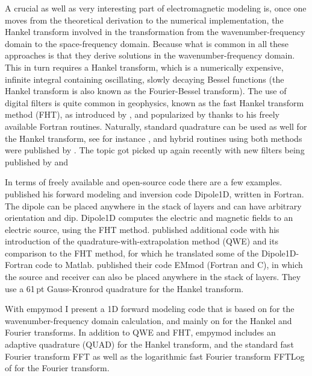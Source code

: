 \documentclass[paper]{geophysics}
\begin{document}
A crucial as well as very interesting part of electromagnetic modeling is, once
one moves from the theoretical derivation to the numerical implementation, the
Hankel transform involved in the transformation from the
wave\-num\-ber-fre\-que\-ncy domain to the space-frequency domain. Because
what is common in all these approaches is that they derive solutions in the
wavenumber-frequency domain. This in turn requires a Hankel transform, which is
a numerically expensive, infinite integral containing oscillating, slowly
decaying Bessel functions (the Hankel transform is also known as the
Fourier-Bessel transform). The use of digital filters is quite common in
geophysics, known as the fast Hankel transform method (FHT), as introduced by
\cite{GP.71.Gosh}, and popularized by \cite{TRP.75.Anderson, GEO.79.Anderson,
TMS.82.Anderson} thanks to his freely available Fortran routines. Naturally,
standard quadrature can be used as well for the Hankel transform, see for
instance \cite{GEO.83.Chave}, and hybrid routines using both methods were
published by \cite{GEO.84.Anderson, GEO.89.Anderson}. The topic got picked up
again recently with new filters being published by \cite{GP.07.Kong} and
\cite{GEO.09.Key, GEO.12.Key}

In terms of freely available and open-source code there are a few examples.
\cite{GEO.09.Key} published his forward modeling and inversion code Dipole1D,
written in Fortran. The dipole can be placed anywhere in the stack of layers
and can have arbitrary orientation and dip. Dipole1D computes the electric and
magnetic fields to an electric source, using the FHT method. \cite{GEO.12.Key}
published additional code with his introduction of the
qua\-dra\-ture-with-ex\-tra\-po\-la\-tion method (QWE) and its comparison to
the FHT method, for which he translated some of the Dipole1D-Fortran code to
Matlab. \cite{GEO.15.Hunziker} published their code EMmod (Fortran and C), in
which the source and receiver can also be placed anywhere in the stack of
layers. They use a 61\,pt Gauss-Kronrod quadrature for the Hankel transform.

With empymod I present a 1D forward modeling code that is based on
\cite{GEO.15.Hunziker} for the wavenumber-frequency domain calculation, and
mainly on \cite{GEO.12.Key} for the Hankel and Fourier transforms. In addition
to QWE and FHT, empymod includes an adaptive quadrature (QUAD) for the Hankel
transform, and the standard fast Fourier transform FFT as well as the
logarithmic fast Fourier transform FFTLog of \cite{RAS.00.Hamilton} for the
Fourier transform.
\end{document}
